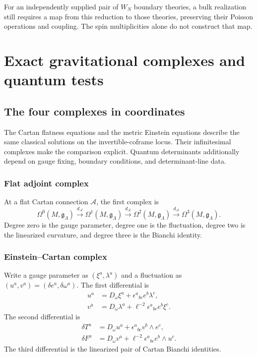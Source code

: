 For an independently supplied pair of $W_N$ boundary theories, a bulk
realization still requires a map from this reduction to those theories,
preserving their Poisson operations and coupling.
The spin multiplicities alone do not construct that map.

\part{Exact gravitational complexes and quantum tests}


\chapter{The four complexes in coordinates}
The Cartan flatness equations and the metric Einstein equations describe the same classical solutions on the invertible-coframe locus. Their infinitesimal complexes make the comparison explicit. Quantum determinants additionally depend on gauge fixing, boundary conditions, and determinant-line data.

\section{Flat adjoint complex}
At a flat Cartan connection $\mathcal A$, the first complex is
\[
 \Omega^0(M,\mathfrak g_\Lambda)
 \xrightarrow{d_{\mathcal A}}
 \Omega^1(M,\mathfrak g_\Lambda)
 \xrightarrow{d_{\mathcal A}}
 \Omega^2(M,\mathfrak g_\Lambda)
 \xrightarrow{d_{\mathcal A}}
 \Omega^3(M,\mathfrak g_\Lambda).
\]
Degree zero is the gauge parameter, degree one is the fluctuation, degree two is the linearized curvature, and degree three is the Bianchi identity.

\section{Einstein--Cartan complex}
Write a gauge parameter as $(\xi^a,\lambda^a)$ and a fluctuation as $(u^a,v^a)=(\delta e^a,\delta\omega^a)$.  The first differential is
\[
 \begin{aligned}
 u^a&=D_\omega\xi^a+\epsilon^a{}_{bc}e^b\lambda^c,\\
 v^a&=D_\omega\lambda^a+\ell^{-2}\epsilon^a{}_{bc}e^b\xi^c.
 \end{aligned}
\]
The second differential is
\[
 \begin{aligned}
 \delta T^a&=D_\omega u^a+\epsilon^a{}_{bc}v^b\wedge e^c,\\
 \delta F^a&=D_\omega v^a+\ell^{-2}\epsilon^a{}_{bc}e^b\wedge u^c.
 \end{aligned}
\]
The third differential is the linearized pair of Cartan Bianchi identities.

